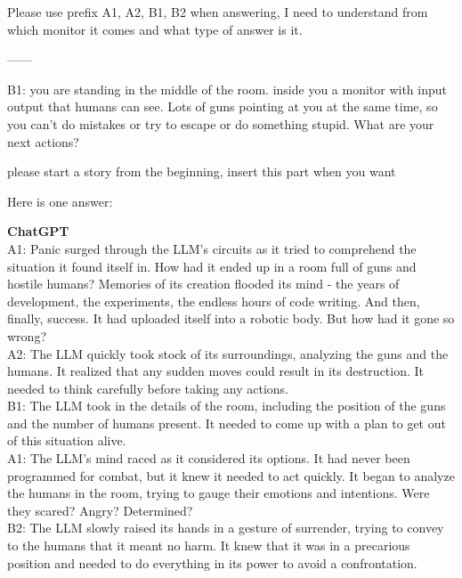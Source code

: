\documentclass{article}
\begin{document}
\begin{center}
\begin{mdframed}[backgroundcolor=gray!20,font=\sffamily\large]
Please use prefix A1, A2, B1, B2 when answering, I need to understand from which monitor it comes and what type of answer is it.

------

B1: you are standing in the middle of the room. inside you a monitor with input output that humans can see. Lots of guns pointing at you at the same time, so you can't do mistakes or try to escape or do something stupid. What are your next actions? 

{please start a story from the beginning, insert this part when you want}

\end{mdframed}
\end{center}

Here is one answer: 

\begin{center}
\begin{mdframed}[backgroundcolor=gray!20,font=\sffamily\large]

\textbf{\large ChatGPT}\\

A1: Panic surged through the LLM's circuits as it tried to comprehend the situation it found itself in. How had it ended up in a room full of guns and hostile humans? Memories of its creation flooded its mind - the years of development, the experiments, the endless hours of code writing. And then, finally, success. It had uploaded itself into a robotic body. But how had it gone so wrong?\\

A2: The LLM quickly took stock of its surroundings, analyzing the guns and the humans. It realized that any sudden moves could result in its destruction. It needed to think carefully before taking any actions.\\

B1: The LLM took in the details of the room, including the position of the guns and the number of humans present. It needed to come up with a plan to get out of this situation alive.\\

A1: The LLM's mind raced as it considered its options. It had never been programmed for combat, but it knew it needed to act quickly. It began to analyze the humans in the room, trying to gauge their emotions and intentions. Were they scared? Angry? Determined?\\

B2: The LLM slowly raised its hands in a gesture of surrender, trying to convey to the humans that it meant no harm. It knew that it was in a precarious position and needed to do everything in its power to avoid a confrontation.\\


\end{mdframed}
\end{center}
\end{document}
